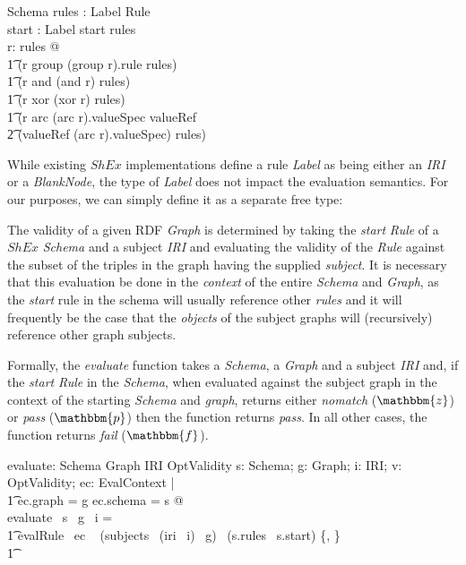 \documentclass[fuzz]{llncs}
\def\entryFor{\cdot}
\def\pass{{\mathbbm{p}}}
\def\fail{{\mathbbm{f}}}
\def\nomatch{\mathbbm{z}}
\def\zc{\textit}
\begin{document}
\begin{schema}{Schema}
   rules : Label \pfun Rule \\
   start : Label
\where
   start \in \dom rules \\
\forall r: \ran rules @ \\
\t1 (r \in \ran group \implies (group \entryFor r).rule \in \dom rules) \land \\
\t1 (r \in \ran and \implies \ran (and \entryFor r) \subseteq \dom rules) \land \\
\t1 (r \in \ran xor \implies \ran (xor \entryFor r) \subseteq \dom rules) \land \\ 
\t1 (r \in \ran arc \land (arc \entryFor r).valueSpec \in \ran valueRef \implies \\
\t2 (valueRef \entryFor (arc \entryFor r).valueSpec) \in \dom rules)
\end{schema}
While existing $ShEx$ implementations define a rule \zc{Label} as being either an \zc{IRI} or
a \zc{BlankNode}, the type of \zc{Label} does not impact the evaluation semantics.  For our 
purposes, we can simply define it as a separate free type:
\begin{zed}
[Label]
\end{zed}


The validity of a given RDF \zc{Graph} is determined by taking the \zc{start} \zc{Rule} of a
$ShEx$ \zc{Schema} and a subject \zc{IRI} and evaluating the validity of the \zc{Rule} against
the subset of the triples in the graph having the supplied \zc{subject}.  It is necessary that
this evaluation be done in the \textit{context} of the entire \zc{Schema} and \zc{Graph}, as
the \zc{start} rule in the schema will usually reference other \zc{rules} and it will
frequently be the case that the \zc{objects} of the subject graphs will (recursively) reference
other graph subjects.

Formally, the \zc{evaluate} function takes a \zc{Schema}, a \zc{Graph} and a subject \zc{IRI}
and, if the \zc{start} \zc{Rule} in the \zc{Schema}, when evaluated against the subject graph
in the context of the starting \zc{Schema} and \zc{graph}, returns either \zc{nomatch} 
($\nomatch$) or \zc{pass} ($\pass$) then the function returns \zc{pass}.  In all other cases,
the function returns \zc{fail} ($\fail$).
\begin{gendef}
   evaluate: Schema \fun Graph \fun IRI \fun OptValidity
\where
   \forall s: Schema; g: Graph; i: IRI; v: OptValidity; ec: EvalContext | \\
\t1 ec.graph = g \land ec.schema = s @ \\
   evaluate ~s ~g ~i = \\
\t1 \IF evalRule ~ec ~ (subjects~ (iri~ i)~ g)~ (s.rules~ s.start) \in \{\nomatch, \pass\} \\
\t1 \THEN \pass \ELSE \fail
\end{gendef}
\end{document}
